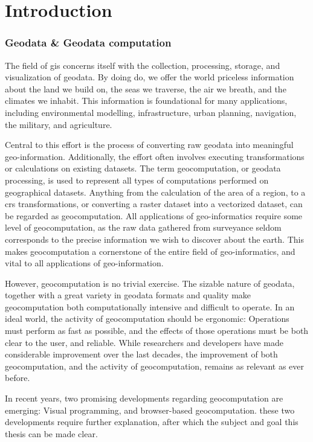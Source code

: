 \chapter{Introduction}

\subsection*{Geodata \& Geodata computation}

The field of \ac{gis} concerns itself with the collection, processing, storage, and visualization of geodata. 
By doing do, we offer the world priceless information about the land we build on, the seas we traverse, the air we breath, and the climates we inhabit. 
This information is foundational for many applications, including environmental modelling, infrastructure, urban planning, navigation, the military, and agriculture.   

Central to this effort is the process of converting raw geodata into meaningful geo-information. 
Additionally, the effort often involves executing transformations or calculations on existing datasets. 
The term \ac{geocomputation}, or geodata processing, is used to represent all types of computations performed on geographical datasets. Anything from the calculation of the area of a region, to a \ac{crs} transformations, or converting a raster dataset into a vectorized dataset, can be regarded as geocomputation.
All applications of geo-informatics require some level of geocomputation, as the raw data gathered from surveyance seldom corresponds to the precise information we wish to discover about the earth.       
This makes geocomputation a cornerstone of the entire field of geo-informatics, and vital to all applications of geo-information.

However, geocomputation is no trivial exercise. The sizable nature of geodata, together with a great variety in geodata formats and quality make geocomputation both computationally intensive and difficult to operate. 
In an ideal world, the activity of geocomputation should be ergonomic: Operations must perform as fast as possible, and the effects of those operations must be both clear to the user, and reliable.
While researchers and developers have made considerable improvement over the last decades, the improvement of both geocomputation, and the activity of geocomputation, remains as relevant as ever before. 

In recent years, two promising developments regarding geocomputation are emerging:
Visual programming, and browser-based geocomputation. 
these two developments require further explanation, after which the subject and goal this thesis can be made clear.

